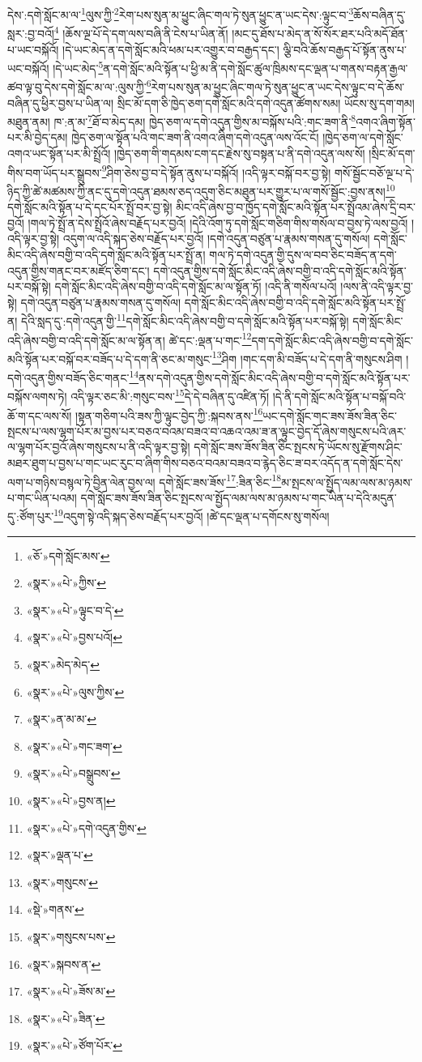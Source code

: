 དེས་:དགེ་སློང་མ་ལ་\footnote{«ཅོ་»དགེ་སློང་མས་}ལུས་ཀྱི་\footnote{«སྣར་»«པེ་»ཀྱིས་}རེག་པས་སུན་མ་ཕྱུང་ཞིང་གལ་ཏེ་སུན་ཕྱུང་ན་ཡང་དེས་:ལྟུང་བ་\footnote{«སྣར་»«པེ་»ལྟུང་བ་དེ་}ཆོས་བཞིན་དུ་སླར་:བྱ་བའོ།\footnote{«སྣར་»«པེ་»བྱས་པའོ།} །ཆོས་ལྔ་པོ་དེ་དག་ལས་བཞི་ནི་ངེས་པ་ཡིན་ནོ། །མང་དུ་ཐོས་པ་མེད་ན་སོ་སོར་ཐར་པའི་མདོ་ཐོན་པ་ཡང་བསྐོའོ། །དེ་ཡང་མེད་ན་དགེ་སློང་མའི་ཕམ་པར་འགྱུར་བ་བརྒྱད་དང་། ལྕི་བའི་ཆོས་བརྒྱད་པོ་སྟོན་ནུས་པ་ཡང་བསྐོའོ། །དེ་ཡང་མེད་\footnote{«སྣར་»མེད་མེད་}ན་དགེ་སློང་མའི་སྟོན་པ་ཕྱི་མ་ནི་དགེ་སློང་ཚུལ་ཁྲིམས་དང་ལྡན་པ་གནས་བརྟན་རྒྱལ་ཚབ་ལྟ་བུ་དེས་དགེ་སློང་མ་ལ་:ལུས་ཀྱི་\footnote{«སྣར་»«པེ་»ལུས་ཀྱིས་}རེག་པས་སུན་མ་ཕྱུང་ཞིང་གལ་ཏེ་སུན་ཕྱུང་ན་ཡང་དེས་ལྟུང་བ་དེ་ཆོས་བཞིན་དུ་ཕྱིར་བྱས་པ་ཡིན་ལ། སྲིང་མོ་དག་ཅི་ཁྱེད་ཅག་དགེ་སློང་མའི་དགེ་འདུན་ཚོགས་སམ། ཡོངས་སུ་དག་གམ། མཐུན་ནམ། ཁ་:ན་མ་\footnote{«སྣར་»ན་མ་མ་}ཐོ་བ་མེད་དམ། ཁྱེད་ཅག་ལ་དགེ་འདུན་གྱིས་མ་བསྐོས་པའི་:གང་ཟག་ནི་\footnote{«སྣར་»«པེ་»གང་ཟག་}འགའ་ཞིག་སྟོན་པར་མི་བྱེད་དམ། ཁྱེད་ཅག་ལ་སྟོན་པའི་གང་ཟག་ནི་འགའ་ཞིག་དགེ་འདུན་ལས་འོང་ངོ། །ཁྱེད་ཅག་ལ་དགེ་སློང་འགའ་ཡང་སྟོན་པར་མི་སྤྲོའོ། །ཁྱེད་ཅག་གི་གདམས་ངག་དང་རྗེས་སུ་བསྟན་པ་ནི་དགེ་འདུན་ལས་སོ། །སྲིང་མོ་དག་གིས་བག་ཡོད་པར་སྒྲུབས་\footnote{«སྣར་»«པེ་»བསྒྲུབས་}ཤིག་ཅེས་བྱ་བ་དེ་སྟོན་ནུས་པ་བསྐོའོ། །འདི་ལྟར་བསྐོ་བར་བྱ་སྟེ། གསོ་སྦྱོང་བཅོ་ལྔ་པ་དེ་ཉིད་ཀྱི་ཚེ་མཚམས་ཀྱི་ནང་དུ་དགེ་འདུན་ཐམས་ཅད་འདུག་ཅིང་མཐུན་པར་གྱུར་པ་ལ་གསོ་སྦྱོང་:བྱས་ནས།\footnote{«སྣར་»«པེ་»བྱས་ན།} དགེ་སློང་མའི་སྟོན་པ་དེ་དང་པོར་སྤྲོ་བར་བྱ་སྟེ། མིང་འདི་ཞེས་བྱ་བ་ཁྱོད་དགེ་སློང་མའི་སྟོན་པར་སྤྲོའམ་ཞེས་དྲི་བར་བྱའོ། །གལ་ཏེ་སྤྲོ་ན་དེས་སྤྲོའོ་ཞེས་བརྗོད་པར་བྱའོ། །དེའི་འོག་ཏུ་དགེ་སློང་གཅིག་གིས་གསོལ་བ་བྱས་ཏེ་ལས་བྱའོ། །འདི་ལྟར་བྱ་སྟེ། འདུག་ལ་འདི་སྐད་ཅེས་བརྗོད་པར་བྱའོ། །དགེ་འདུན་བཙུན་པ་རྣམས་གསན་དུ་གསོལ། དགེ་སློང་མིང་འདི་ཞེས་བགྱི་བ་འདི་དགེ་སློང་མའི་སྟོན་པར་སྤྲོ་ན། གལ་ཏེ་དགེ་འདུན་གྱི་དུས་ལ་བབ་ཅིང་བཟོད་ན་དགེ་འདུན་གྱིས་གནང་བར་མཛོད་ཅིག་དང་། དགེ་འདུན་གྱིས་དགེ་སློང་མིང་འདི་ཞེས་བགྱི་བ་འདི་དགེ་སློང་མའི་སྟོན་པར་བསྐོ་སྟེ། དགེ་སློང་མིང་འདི་ཞེས་བགྱི་བ་འདི་དགེ་སློང་མ་ལ་སྟོན་ཏོ། །འདི་ནི་གསོལ་པའོ། །ལས་ནི་འདི་ལྟར་བྱ་སྟེ། དགེ་འདུན་བཙུན་པ་རྣམས་གསན་དུ་གསོལ། དགེ་སློང་མིང་འདི་ཞེས་བགྱི་བ་འདི་དགེ་སློང་མའི་སྟོན་པར་སྤྲོ་ན། དེའི་སླད་དུ་:དགེ་འདུན་གྱི་\footnote{«སྣར་»«པེ་»དགེ་འདུན་གྱིས་}དགེ་སློང་མིང་འདི་ཞེས་བགྱི་བ་དགེ་སློང་མའི་སྟོན་པར་བསྐོ་སྟེ། དགེ་སློང་མིང་འདི་ཞེས་བགྱི་བ་འདི་དགེ་སློང་མ་ལ་སྟོན་ན། ཚེ་དང་:ལྡན་པ་གང་\footnote{«སྣར་»ལྡན་པ་}དག་དགེ་སློང་མིང་འདི་ཞེས་བགྱི་བ་དགེ་སློང་མའི་སྟོན་པར་བསྐོ་བར་བཟོད་པ་དེ་དག་ནི་ཅང་མ་གསུང་\footnote{«སྣར་»གསུངས་}ཤིག །གང་དག་མི་བཟོད་པ་དེ་དག་ནི་གསུངས་ཤིག །དགེ་འདུན་གྱིས་བཟོད་ཅིང་གནང་\footnote{«སྡེ་»གནས་}ནས་དགེ་འདུན་གྱིས་དགེ་སློང་མིང་འདི་ཞེས་བགྱི་བ་དགེ་སློང་མའི་སྟོན་པར་བསྐོས་ལགས་ཏེ། འདི་ལྟར་ཅང་མི་:གསུང་བས་\footnote{«སྣར་»གསུངས་པས་}དེ་དེ་བཞིན་དུ་འཛིན་ཏོ། །དེ་ནི་དགེ་སློང་མའི་སྟོན་པ་བསྐོ་བའི་ཆོ་ག་དང་ལས་སོ། །སྟན་གཅིག་པའི་ཟས་ཀྱི་ལྟུང་བྱེད་ཀྱི་:སྐབས་ནས་\footnote{«སྣར་»སྐབས་ན་}ཡང་དགེ་སློང་གང་ཟས་ཟོས་ཟིན་ཅིང་སྤངས་པ་ལས་ལྷག་པོར་མ་བྱས་པར་བཅའ་བའམ་བཟའ་བ་འཆའ་འམ་ཟ་ན་ལྟུང་བྱེད་དོ་ཞེས་གསུངས་པའི་ཞར་ལ་ལྷག་པོར་བྱའོ་ཞེས་གསུངས་པ་ནི་འདི་ལྟར་བྱ་སྟེ། དགེ་སློང་ཟས་ཟོས་ཟིན་ཅིང་སྤངས་ཏེ་ཡོངས་སུ་རྫོགས་ཤིང་མཐར་ཐུག་པ་བྱས་པ་གང་ཡང་རུང་བ་ཞིག་གིས་བཅའ་བའམ་བཟའ་བ་རྙེད་ཅིང་ཟ་བར་འདོད་ན་དགེ་སློང་དེས་ལག་པ་གཉིས་བསྙལ་ཏེ་བྱིན་ལེན་བྱས་ལ། དགེ་སློང་ཟས་ཟོས་\footnote{«སྣར་»«པེ་»ཟོས་མ་}:ཟིན་ཅིང་\footnote{«སྣར་»«པེ་»ཟིན་}མ་སྤངས་ལ་སྤྱོད་ལམ་ལས་མ་ཉམས་པ་གང་ཡིན་པའམ། དགེ་སློང་ཟས་ཟོས་ཟིན་ཅིང་སྤངས་ལ་སྤྱོད་ལམ་ལས་མ་ཉམས་པ་གང་ཡིན་པ་དེའི་མདུན་དུ་:ཙོག་པུར་\footnote{«སྣར་»«པེ་»ཙོག་པོར་}འདུག་སྟེ་འདི་སྐད་ཅེས་བརྗོད་པར་བྱའོ། །ཚེ་དང་ལྡན་པ་དགོངས་སུ་གསོལ། 